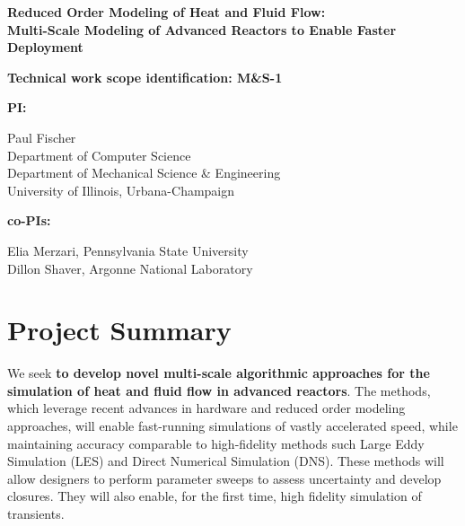 \parindent 0in
\parskip 0.1in

\begin{center}
{\bf Reduced Order Modeling of Heat and Fluid Flow: \\ 
Multi-Scale Modeling of Advanced Reactors to Enable Faster Deployment}
\end{center}

{\bf Technical work scope identification: M\&S-1 }

{\bf PI: }\begin{minipage}[t]{5in}
Paul Fischer \\
Department of Computer Science \\
Department of Mechanical Science \& Engineering \\
University of Illinois, Urbana-Champaign \\
\end{minipage}

{\bf co-PIs: } \begin{minipage}[t]{5in}
Elia Merzari, Pennsylvania State University \\
Dillon Shaver, Argonne National Laboratory \\[-3ex]
\end{minipage}

\section{Project Summary}


We seek \textbf{to develop novel multi-scale algorithmic approaches for the
simulation of heat and fluid flow in advanced reactors}. The methods, which
leverage recent advances in hardware and reduced order modeling approaches,
will enable fast-running simulations of vastly accelerated speed, while
maintaining accuracy comparable to high-fidelity methods such Large Eddy
Simulation (LES) and Direct Numerical Simulation (DNS). These methods will
allow designers to perform
parameter sweeps to assess uncertainty and develop closures. They will also
enable, for the first time, high fidelity simulation of transients.


